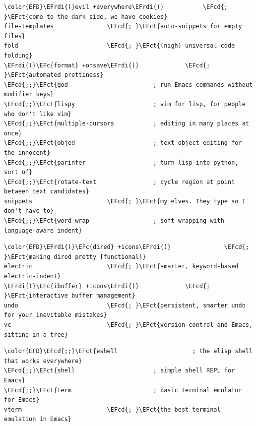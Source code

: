 \documentclass{scrartcl}
\newcommand{\EFct}[1]{\textcolor{EFct}{#1}} %
\newcommand{\EFc}[1]{\textcolor{EFc}{#1}} %
\newcommand{\EFcd}[1]{\textcolor{EFcd}{#1}} %
\newcommand{\EFrdi}[1]{#1} %
\begin{document}
\begin{enumerate}
\begin{Code}
\begin{Verbatim}[]
\color{EFD}\EFrdi{(}evil +everywhere\EFrdi{)}           \EFcd{; }\EFct{come to the dark side, we have cookies}
file-templates               \EFcd{; }\EFct{auto-snippets for empty files}
fold                         \EFcd{; }\EFct{(nigh) universal code folding}
\EFrdi{(}\EFc{format} +onsave\EFrdi{)}             \EFcd{; }\EFct{automated prettiness}
\EFcd{;;}\EFct{god                        ; run Emacs commands without modifier keys}
\EFcd{;;}\EFct{lispy                      ; vim for lisp, for people who don't like vim}
\EFcd{;;}\EFct{multiple-cursors           ; editing in many places at once}
\EFcd{;;}\EFct{objed                      ; text object editing for the innocent}
\EFcd{;;}\EFct{parinfer                   ; turn lisp into python, sort of}
\EFcd{;;}\EFct{rotate-text                ; cycle region at point between text candidates}
snippets                     \EFcd{; }\EFct{my elves. They type so I don't have to}
\EFcd{;;}\EFct{word-wrap                  ; soft wrapping with language-aware indent}
\end{Verbatim}
\end{Code}

\begin{Code}
\begin{Verbatim}[]
\color{EFD}\EFrdi{(}\EFc{dired} +icons\EFrdi{)}               \EFcd{; }\EFct{making dired pretty [functional]}
electric                     \EFcd{; }\EFct{smarter, keyword-based electric-indent}
\EFrdi{(}\EFc{ibuffer} +icons\EFrdi{)}             \EFcd{; }\EFct{interactive buffer management}
undo                         \EFcd{; }\EFct{persistent, smarter undo for your inevitable mistakes}
vc                           \EFcd{; }\EFct{version-control and Emacs, sitting in a tree}
\end{Verbatim}
\end{Code}

\begin{Code}
\begin{Verbatim}[]
\color{EFD}\EFcd{;;}\EFct{eshell                     ; the elisp shell that works everywhere}
\EFcd{;;}\EFct{shell                      ; simple shell REPL for Emacs}
\EFcd{;;}\EFct{term                       ; basic terminal emulator for Emacs}
vterm                        \EFcd{; }\EFct{the best terminal emulation in Emacs}
\end{Verbatim}
\end{Code}


\end{enumerate}
\end{document}
